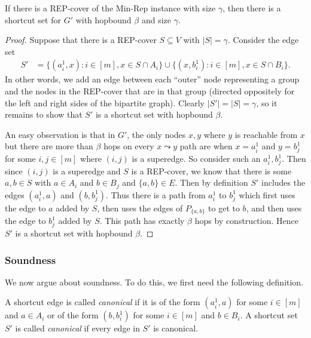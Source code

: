 \begin{lemma} \label{lem:completeness}
    If there is a REP-cover of the Min-Rep instance with size $\gamma$, then there is a shortcut set for $G'$ with hopbound $\beta$ and size $\gamma$.
\end{lemma}
\begin{proof}
Suppose that there is a REP-cover $S \subseteq V$ with $|S|= \gamma$.  Consider the edge set 
\begin{align*}
    S' &= \{(a_i^1, x) : i \in [m], x \in S \cap A_i\} \cup \{(x, b_i^1) : i \in [m], x \in S \cap B_i\}.
\end{align*}
In other words, we add an edge between each ``outer'' node representing a group and the nodes in the REP-cover that are in that group (directed oppositely for the left and right sides of the bipartite graph).  Clearly $|S'| = |S| = \gamma$, so it remains to show that $S'$ is a shortcut set with hopbound $\beta$.  

An easy observation is that in $G'$, the only nodes $x, y$ where $y$ is reachable from $x$ but there are more than $\beta$ hops on every $x \leadsto y$ path are when $x = a_i^1$ and $y = b_j^1$ for some $i,j \in [m]$ where $(i,j)$ is a superedge.  So consider such an $a_i^1, b_j^1$.  Then since $(i,j)$ is a superedge and $S$ is a REP-cover, we know that there is some $a,b \in S$ with $a \in A_i$ and $b \in B_j$ and $\{a,b\} \in E$.  Then by definition $S'$ includes the edges $(a_i^1, a)$ and $(b, b_j^1)$.  Thus there is a path from $a_i^1$ to $b_j^1$ which first uses the edge to $a$ added by $S$, then uses the edges of $P_{\{a,b\}}$ to get to $b$, and then uses the edge to $b_j^1$ added by $S$.  This path has exactly $\beta$ hops by construction.  Hence $S'$ is a shortcut set with hopbound $\beta$.
\end{proof}

\subsubsection{Soundness}
We now argue about soundness.  To do this, we first need the following definition.

\begin{definition} \label{def:canonical}
    A shortcut edge is called \emph{canonical} if it is of the form $(a_i^1, a)$ for some $i \in [m]$ and $a \in A_i$ or of the form $(b, b_i^1)$ for some $i \in [m]$ and $b \in B_i$.  A shortcut set $S'$ is called \emph{canonical} if every edge in $S'$ is canonical. 
\end{definition}

